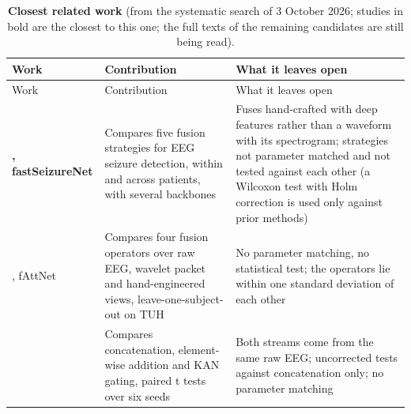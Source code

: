 \documentclass[11pt,a4paper]{article}
\begin{document}
\begin{longtable}[]{@{}
  >{\raggedright\arraybackslash}p{}
  >{\raggedright\arraybackslash}p{}
  >{\raggedright\arraybackslash}p{}@{}}
\caption{\textbf{Closest related work} (from the systematic search of 3 October 2026; studies in bold are the closest to this one; the full texts of the remaining candidates are still being read).}\tabularnewline
\toprule\noalign{}
\begin{minipage}[b]{\linewidth}\raggedright
Work
\end{minipage} & \begin{minipage}[b]{\linewidth}\raggedright
Contribution
\end{minipage} & \begin{minipage}[b]{\linewidth}\raggedright
What it leaves open
\end{minipage} \\
\midrule\noalign{}
\endfirsthead
\toprule\noalign{}
\begin{minipage}[b]{\linewidth}\raggedright
Work
\end{minipage} & \begin{minipage}[b]{\linewidth}\raggedright
Contribution
\end{minipage} & \begin{minipage}[b]{\linewidth}\raggedright
What it leaves open
\end{minipage} \\
\midrule\noalign{}
\endhead
\bottomrule\noalign{}
\endlastfoot
\textbf{\citet{An_2026}, fastSeizureNet} & Compares five fusion strategies for EEG seizure detection, within and across patients, with several backbones & Fuses hand-crafted with deep features rather than a waveform with its spectrogram; strategies not parameter matched and not tested against each other (a Wilcoxon test with Holm correction is used only against prior methods) \\
\citet{Einizade_2023}, fAttNet & Compares four fusion operators over raw EEG, wavelet packet and hand-engineered views, leave-one-subject-out on TUH & No parameter matching, no statistical test; the operators lie within one standard deviation of each other \\
\citet{Basheer_2026} & Compares concatenation, element-wise addition and KAN gating, paired t tests over six seeds & Both streams come from the same raw EEG; uncorrected tests against concatenation only; no parameter matching \\

\end{longtable}
\end{document}
